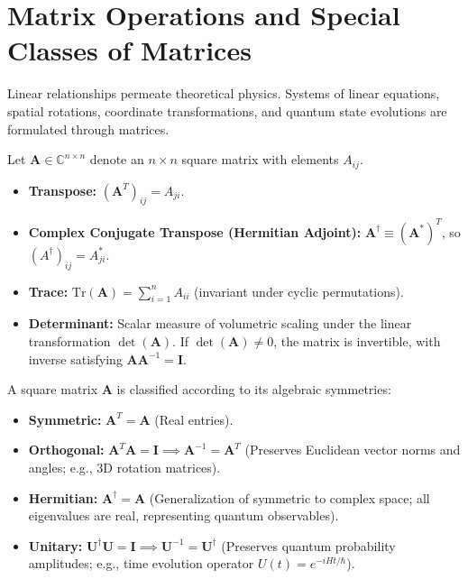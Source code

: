\section{Matrix Operations and Special Classes of Matrices}
Linear relationships permeate theoretical physics. Systems of linear equations, spatial rotations, coordinate transformations, and quantum state evolutions are formulated through matrices.

Let $\mathbf{A} \in \mathbb{C}^{n \times n}$ denote an $n \times n$ square matrix with elements $A_{ij}$.
\begin{itemize}
    \item \textbf{Transpose:} $(\mathbf{A}^T)_{ij} = A_{ji}$.
    \item \textbf{Complex Conjugate Transpose (Hermitian Adjoint):} $\mathbf{A}^\dagger \equiv (\mathbf{A}^*)^T$, so $(A^\dagger)_{ij} = A_{ji}^*$.
    \item \textbf{Trace:} $\text{Tr}(\mathbf{A}) = \sum_{i=1}^n A_{ii}$ (invariant under cyclic permutations).
    \item \textbf{Determinant:} Scalar measure of volumetric scaling under the linear transformation $\det(\mathbf{A})$. If $\det(\mathbf{A}) \neq 0$, the matrix is invertible, with inverse satisfying $\mathbf{A}\mathbf{A}^{-1} = \mathbf{I}$.
\end{itemize}

\begin{mathdefinition}
A square matrix $\mathbf{A}$ is classified according to its algebraic symmetries:
\begin{itemize}
    \item \textbf{Symmetric:} $\mathbf{A}^T = \mathbf{A}$ (Real entries).
    \item \textbf{Orthogonal:} $\mathbf{A}^T \mathbf{A} = \mathbf{I} \implies \mathbf{A}^{-1} = \mathbf{A}^T$ (Preserves Euclidean vector norms and angles; e.g., 3D rotation matrices).
    \item \textbf{Hermitian:} $\mathbf{A}^\dagger = \mathbf{A}$ (Generalization of symmetric to complex space; all eigenvalues are real, representing quantum observables).
    \item \textbf{Unitary:} $\mathbf{U}^\dagger \mathbf{U} = \mathbf{I} \implies \mathbf{U}^{-1} = \mathbf{U}^\dagger$ (Preserves quantum probability amplitudes; e.g., time evolution operator $U(t) = e^{-iHt/\hbar}$).
\end{itemize}
\end{mathdefinition}

